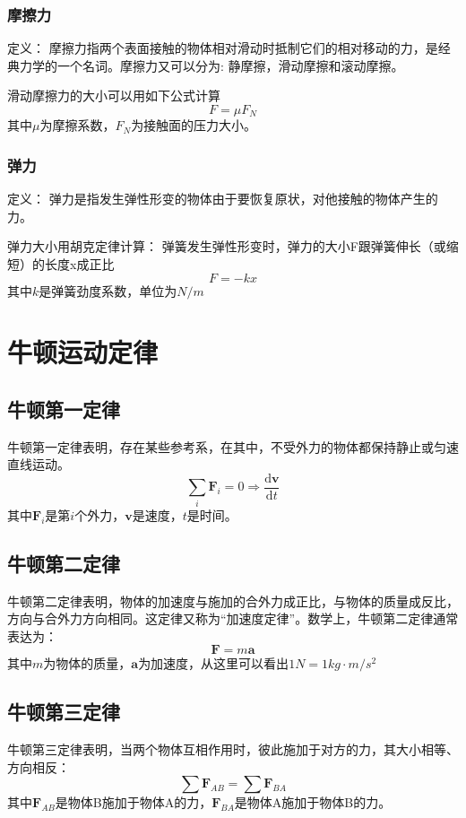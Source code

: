 \documentclass[a4paper,oneside,11pt]{article}
\newcommand{\bol}[1]{\textbf{#1}}
\newcommand{\diff}{\mathrm{d}}
\begin{document}
\subsubsection{摩擦力}
定义： 摩擦力指两个表面接触的物体相对滑动时抵制它们的相对移动的力，是经典力学的一个名词。摩擦力又可以分为: 静摩擦，滑动摩擦和滚动摩擦。
\par 滑动摩擦力的大小可以用如下公式计算
\begin{displaymath}
F = \mu F_N
\end{displaymath}
其中$\mu$为摩擦系数，$F_N$为接触面的压力大小。
\subsubsection{弹力}
定义： 弹力是指发生弹性形变的物体由于要恢复原状，对他接触的物体产生的力。
\par 弹力大小用胡克定律计算： 弹簧发生弹性形变时，弹力的大小F跟弹簧伸长（或缩短）的长度x成正比
\begin{displaymath}
	F = -kx
\end{displaymath}
其中$k$是弹簧劲度系数，单位为$N/m$
\section{牛顿运动定律}
\subsection{牛顿第一定律}
牛顿第一定律表明，存在某些参考系，在其中，不受外力的物体都保持静止或匀速直线运动。
\begin{displaymath}
	\sum_i \bol{F}_i = 0 \Rightarrow \frac{\diff\bol{v}}{\diff t}
\end{displaymath}
其中$\bol{F}_i$是第$i$个外力，$\bol{v}$是速度，$t$是时间。
\subsection{牛顿第二定律}
牛顿第二定律表明，物体的加速度与施加的合外力成正比，与物体的质量成反比，方向与合外力方向相同。这定律又称为``加速度定律''。数学上，牛顿第二定律通常表达为：
\begin{displaymath}
	\bol{F} = m \bol{a}
\end{displaymath}
其中$m$为物体的质量，$\bol{a}$为加速度，从这里可以看出$1N = 1kg\cdot m/s^2$
\subsection{牛顿第三定律}
牛顿第三定律表明，当两个物体互相作用时，彼此施加于对方的力，其大小相等、方向相反：
\begin{displaymath}
	\sum \bol{F}_{AB} = \sum \bol{F}_{BA}
\end{displaymath}
其中$\bol{F}_{AB}$是物体B施加于物体A的力，$\bol{F}_{BA}$是物体A施加于物体B的力。
\newpage
\end{document}
